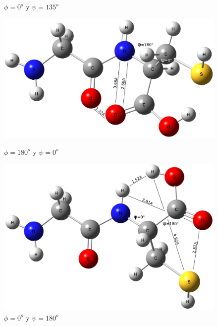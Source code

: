 \documentclass{article}
\begin{document}
\begin{figure}[h!]
\begin{minipage}[b]{0.49\textwidth}
          \caption{$\phi=0^o$ y $\psi=135^o$}
        \end{minipage}
        \begin{minipage}[b]{0.49\textwidth}
            \centering
          \includegraphics[scale=0.085]{GlyCys3D9180fi.png}
          \caption{$\phi=180^o$ y $\psi=0^o$}
        \end{minipage}
        \hfill
        \begin{minipage}[b]{0.49\textwidth}
          \includegraphics[scale=0.085]{GlyCys3D180psi.png}
          \caption{$\phi=0^o$ y $\psi=180^o$}
        \end{minipage}
    \end{figure}
\end{document}
